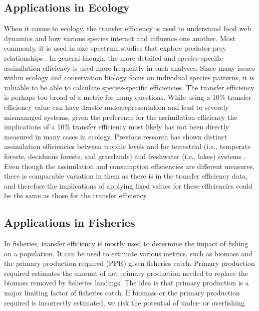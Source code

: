 \documentclass[oneside,12pt,final]{sty/ucthesis-CA2012}
\let\cite\citep                             %
\begin{document}
\begin{mainmatter}
\subsection{Applications in Ecology}
When it comes to ecology, the transfer efficiency is used to understand food web dynamics and how various species interact and influence one another. Most commonly, it is used in size spectrum studies that explore predator-prey relationships \cite{barnes2010global}. In general though, the more detailed and species-specific assimilation efficiency is used more frequently in such analyses. Since many issues within ecology and conservation biology focus on individual species patterns, it is valuable to be able to calculate species-specific efficiencies. The transfer efficiency is perhaps too broad of a metric for many questions. While using a 10\% transfer efficiency value can have drastic underrepresentation and lead to severely mismanaged systems, given the preference for the assimilation efficiency the implications of a 10\% transfer efficiency most likely has not been directly measured in many cases in ecology. Previous research has shown distinct assimilation efficiencies between trophic levels and for terrestrial (i.e., temperate forests, deciduous forests, and grasslands) and freshwater (i.e., lakes) systems \cite{hairston1993causeeffect}. Even though the assimilation and consumption efficiencies are different measures, there is comparable variation in them as there is in the transfer efficiency data, and therefore the implications of applying fixed values for these efficiencies could be the same as those for the transfer efficiency.

\subsection{Applications in Fisheries}
In fisheries, transfer efficiency is mostly used to determine the impact of fishing on a population. It can be used to estimate various metrics, such as biomass and the primary production required (PPR) given fisheries catch. Primary production required estimates the amount of net primary production needed to replace the biomass removed by fisheries landings. The idea is that primary production is a major limiting factor of fisheries catch. If biomass or the primary production required is incorrectly estimated, we risk the potential of under- or overfishing. 

\vspace{5mm}


\end{mainmatter}
\end{document}
